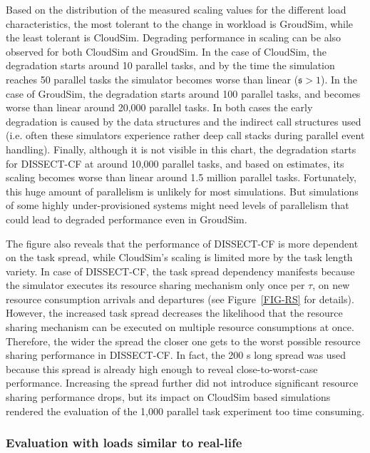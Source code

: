 \documentclass[sort, compress, 5p]{elsarticle}
\newcommand{\SMALLESTIMEGRANULARITYM}{\tau}
\newcommand{\SMALLESTIMEGRANULARITY}{$\SMALLESTIMEGRANULARITYM$}
\begin{document}
Based on the distribution of the measured scaling values for the different load characteristics, the most tolerant to the change in workload is GroudSim, while the least tolerant is CloudSim. Degrading performance in scaling can be also observed for both CloudSim and GroudSim. In the case of CloudSim, the degradation starts around 10 parallel tasks, and by the time the simulation reaches 50 parallel tasks the simulator becomes worse than linear ($\mathfrak{s}>1$). In the case of GroudSim, the degradation starts around 100 parallel tasks, and becomes worse than linear around 20,000 parallel tasks. In both cases the early degradation is caused by the data structures and the indirect call structures used (i.e. often these simulators experience rather deep call stacks during parallel event handling). Finally, although it is not visible in this chart, the degradation starts for DISSECT-CF at around 10,000 parallel tasks, and based on estimates, its scaling becomes worse than linear around 1.5 million parallel tasks. Fortunately, this huge amount of parallelism is unlikely for most simulations. But simulations of some highly under-provisioned systems might need levels of parallelism that could lead to degraded performance even in GroudSim.

The figure also reveals that the performance of DISSECT-CF is more dependent on the task spread, while CloudSim's scaling is limited more by the task length variety. In case of DISSECT-CF, the task spread dependency manifests because the simulator executes its resource sharing mechanism only once per \SMALLESTIMEGRANULARITY, on new resource consumption arrivals and departures (see Figure~\ref{FIG-RS} for details). However, the increased task spread decreases the likelihood that the resource sharing mechanism can be executed on multiple resource consumptions at once. Therefore, the wider the spread the closer one gets to the worst possible resource sharing performance in DISSECT-CF. In fact, the 200 s long spread was used because this spread is already high enough to reveal close-to-worst-case performance. Increasing the spread further did not introduce significant resource sharing performance drops, but its impact on CloudSim based simulations rendered the evaluation of the 1,000 parallel task experiment too time consuming.

\subsubsection{Evaluation with loads similar to real-life}
\end{document}
